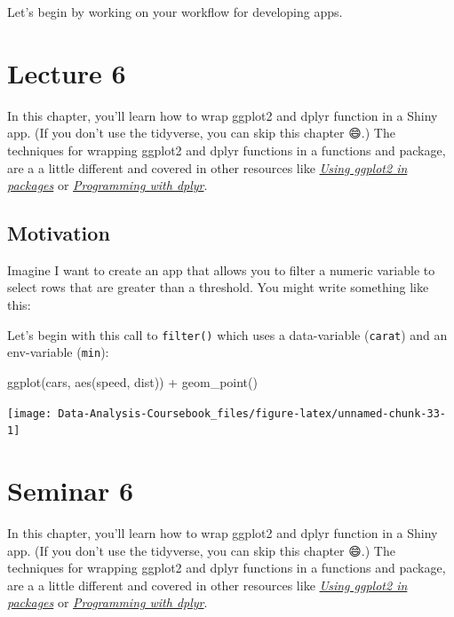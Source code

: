 \documentclass[
]{article}
\newenvironment{Shaded}{\begin{snugshade}}{\end{snugshade}}
\newcommand{\FunctionTok}[1]{\textcolor[rgb]{0.00,0.00,0.00}{#1}}
\newcommand{\NormalTok}[1]{#1}
\newcommand{\SpecialCharTok}[1]{\textcolor[rgb]{0.00,0.00,0.00}{#1}}
\begin{document}
Let's begin by working on your workflow for developing apps.

\hypertarget{lecture6}{%
\section{Lecture 6}\label{lecture6}}

In this chapter, you'll learn how to wrap ggplot2 and dplyr function in a Shiny app.
(If you don't use the tidyverse, you can skip this chapter 😄.) The techniques for wrapping ggplot2 and dplyr functions in a functions and package, are a a little different and covered in other resources like \href{http://ggplot2.tidyverse.org/dev/articles/ggplot2-in-packages.html}{\emph{Using ggplot2 in packages}} or \href{http://dplyr.tidyverse.org/articles/programming.html}{\emph{Programming with dplyr}}.

\hypertarget{tidy-motivation}{%
\subsection{Motivation}\label{tidy-motivation}}

Imagine I want to create an app that allows you to filter a numeric variable to select rows that are greater than a threshold.
You might write something like this:

Let's begin with this call to \texttt{filter()} which uses a data-variable (\texttt{carat}) and an env-variable (\texttt{min}):

\begin{Shaded}
\begin{Highlighting}[]
\FunctionTok{ggplot}\NormalTok{(cars, }\FunctionTok{aes}\NormalTok{(speed, dist)) }\SpecialCharTok{+} 
  \FunctionTok{geom\_point}\NormalTok{()}
\end{Highlighting}
\end{Shaded}

\begin{center}\texttt{[image: Data-Analysis-Coursebook\_files/figure-latex/unnamed-chunk-33-1]} \end{center}

\hypertarget{seminar6}{%
\section{Seminar 6}\label{seminar6}}

In this chapter, you'll learn how to wrap ggplot2 and dplyr function in a Shiny app.
(If you don't use the tidyverse, you can skip this chapter 😄.) The techniques for wrapping ggplot2 and dplyr functions in a functions and package, are a a little different and covered in other resources like \href{http://ggplot2.tidyverse.org/dev/articles/ggplot2-in-packages.html}{\emph{Using ggplot2 in packages}} or \href{http://dplyr.tidyverse.org/articles/programming.html}{\emph{Programming with dplyr}}.
\end{document}
